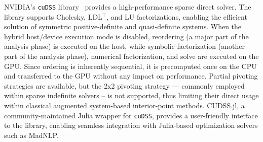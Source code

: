 \documentclass[smallextended]{svjour3}
\begin{document}
NVIDIA's {\tt cuDSS} library~\cite{nvidiaNVIDIACuDSSPreview} provides a high-performance sparse direct solver.
The library supports Cholesky, LDL$^\top$, and LU factorizations, enabling the efficient solution of symmetric positive-definite and quasi-definite systems.
When the hybrid host/device execution mode is disabled, reordering (a major part of the analysis phase) is executed on the host, while symbolic factorization (another part of the analysis phase), numerical factorization, and solve are executed on the GPU.
Since ordering is inherently sequential, it is precomputed once on the CPU and transferred to the GPU without any impact on performance.
Partial pivoting strategies are available, but the 2x2 pivoting strategy --- commonly employed within sparse indefinite solvers -- is not supported, thus limiting their direct usage within classical augmented system-based interior-point methods.
CUDSS.jl, a community-maintained Julia wrapper for {\tt cuDSS}, provides a user-friendly interface to the library, enabling seamless integration with Julia-based optimization solvers such as MadNLP.
\end{document}
